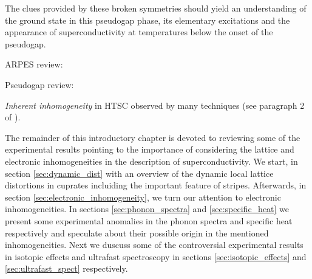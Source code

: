 
The clues provided by these broken symmetries should yield an understanding of the ground state in this pseudogap phase, its elementary excitations and the appearance of superconductivity at temperatures below the onset of the pseudogap. 



ARPES review: \cite{Damascelli2003}

Pseudogap review: \cite{Timusk1999}

\textit{Inherent inhomogeneity} in HTSC observed by many techniques (see paragraph 2 of \cite{Bussmann-Holder2005}).

The remainder of this introductory chapter is devoted to reviewing some of the experimental results pointing to the importance of considering the lattice and electronic inhomogeneities in the description of superconductivity. 
We start, in section \ref{sec:dynamic_dist} with an overview of the dynamic local lattice distortions in cuprates incluiding the important feature of stripes. 
Afterwards, in section \ref{sec:electronic_inhomogeneity}, we turn our attention to electronic inhomogeneities. 
In sections \ref{sec:phonon_spectra} and \ref{sec:specific_heat} we present some experimental anomalies in the phonon spectra and specific heat respectively and speculate about their possible origin in the mentioned inhomogeneities. 
Next we duscuss some of the controversial experimental results in isotopic effects and ultrafast spectroscopy in sections \ref{sec:isotopic_effects} and \ref{sec:ultrafast_spect} respectively.

